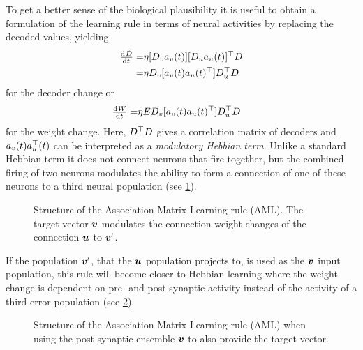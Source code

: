 To get a better sense of the biological plausibility it is useful to obtain a formulation of the learning rule in terms of neural activities by replacing the decoded values, yielding
\begin{eqnarray}
    \od{\tilde{\mat D}}{t} =& \eta [\mat D_v a_v(t)] [\mat D_u a_u(t)]\Tr \mat D \\
    =& \eta \mat D_v [a_v(t) a_u(t)\Tr] \mat D_u\Tr \mat D
\end{eqnarray}
for the decoder change or
\begin{eqnarray}
    \od{\tilde{\mat W}}{t} =& \eta \mat E \mat D_v [a_v(t) a_u(t)\Tr] \mat D_u\Tr \mat D
\end{eqnarray}
for the weight change.
Here, $D^{\top} D$ gives a correlation matrix of decoders and $a_v(t) a_u^{\top}(t)$ can be interpreted as a \emph{modulatory Hebbian term}.
Unlike a standard Hebbian term it does not connect neurons that fire together, but the combined firing of two neurons modulates the ability to form a connection of one of these neurons to a third neural population (see \cref{fig:aml-structure}).
\begin{figure}
    \centering
    \caption{Structure of the Association Matrix Learning rule (AML). The target vector $\bm{v}$ modulates the connection weight changes of the connection $\bm{u}$ to $\bm{v}'$.}\label{fig:aml-structure}
\end{figure}
If the population $\bm{v}'$, that the $\bm{u}$ population projects to, is used as the $\bm{v}$ input population, this rule will become closer to Hebbian learning where the weight change is dependent on pre- and post-synaptic activity instead of the activity of a third error population (see \cref{fig:aml-structure-hebb}).
\begin{figure}
    \centering
    \caption{Structure of the Association Matrix Learning rule (AML) when using the post-synaptic ensemble $\bm{v}$ to also provide the target vector.}\label{fig:aml-structure-hebb}
\end{figure}

